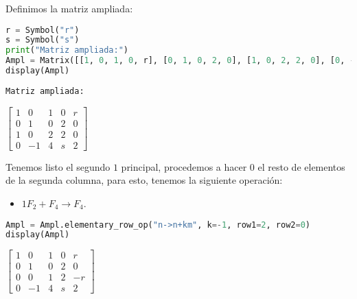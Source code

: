 \documentclass[12pt,a4]{aleph-examen}
\begin{document}
\begin{preguntas}
\begin{respuesta}
    Definimos la matriz ampliada:
\begin{pycodigo}
    \begin{ipynbcodigo}\begin{lstlisting}[language=Python]
r = Symbol("r")
s = Symbol("s")
print("Matriz ampliada:")
Ampl = Matrix([[1, 0, 1, 0, r], [0, 1, 0, 2, 0], [1, 0, 2, 2, 0], [0, -1, 4, s, 2]])
display(Ampl)
    \end{lstlisting}\end{ipynbcodigo}
    \begin{ipynbsalida}[2mm]
    \begin{Verbatim}[commandchars=\\\{\}]
Matriz ampliada:
    \end{Verbatim}

    $\displaystyle \left[\begin{matrix}1 & 0 & 1 & 0 & r\\0 & 1 & 0 & 2 & 0\\1 & 0 & 2 & 2 & 0\\0 & -1 & 4 & s & 2\end{matrix}\right]$
    \end{ipynbsalida}
\end{pycodigo}
    
Tenemos listo el segundo \(1\) principal, procedemos a hacer \(0\) el
resto de elementos de la segunda columna, para esto, tenemos la
siguiente operación:
\begin{itemize}
    \item \(1F_2+F_4\to F_4\).
\end{itemize}
\begin{pycodigo}
    \begin{ipynbcodigo}\begin{lstlisting}[language=Python]
Ampl = Ampl.elementary_row_op("n->n+km", k=-1, row1=2, row2=0)
display(Ampl)
    \end{lstlisting}\end{ipynbcodigo}
    \begin{ipynbsalida}[2mm]
    $\displaystyle \left[\begin{matrix}1 & 0 & 1 & 0 & r\\0 & 1 & 0 & 2 & 0\\0 & 0 & 1 & 2 & - r\\0 & -1 & 4 & s & 2\end{matrix}\right]$
    \end{ipynbsalida}
\end{pycodigo}


\end{respuesta}
\end{preguntas}
\end{document}
